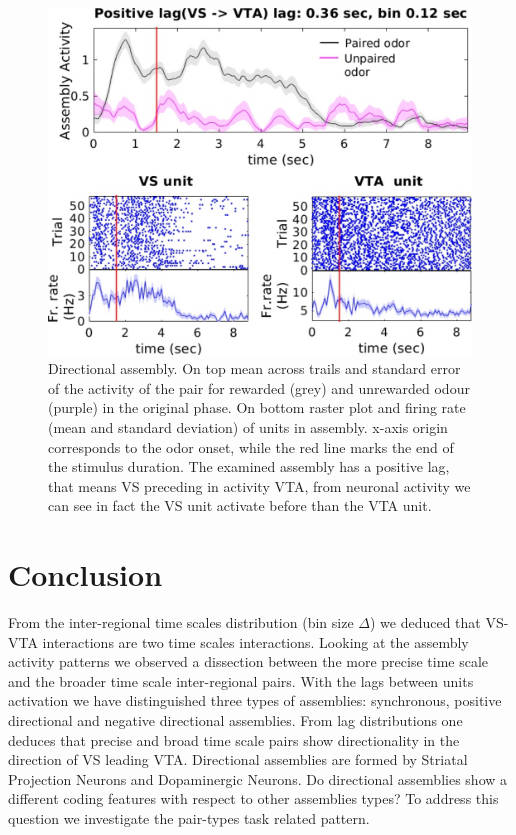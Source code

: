 \begin{figure}
    \centering
    \includegraphics[scale=0.6]{figures/DirectionalAsEx1.pdf}
    \caption{Directional assembly. On top mean across trails and standard error of the activity of the pair for rewarded (grey) and unrewarded odour (purple) in the original phase. On bottom raster plot and firing rate (mean and standard deviation) of units in assembly. x-axis origin corresponds to the odor onset, while the red line marks the end of the stimulus duration. The examined assembly has a positive lag, that means VS preceding in activity VTA, from neuronal activity we can see in fact the VS unit activate before than the VTA unit.}
    \label{fig:directional_assembly}
\end{figure}
\section{Conclusion}
From the inter-regional time scales distribution (bin size $\Delta$) we deduced that VS-VTA interactions are two time scales interactions. Looking at the assembly activity patterns we observed a dissection between the more precise time scale and the broader time scale inter-regional pairs. 
With the lags between units activation we have distinguished three types of assemblies: synchronous, positive directional and negative directional assemblies. From lag distributions one deduces that precise and broad time scale pairs show directionality in the direction of VS leading VTA.
Directional assemblies are formed by Striatal Projection Neurons and Dopaminergic Neurons.
Do directional assemblies show a different coding features with respect to other assemblies types?
To address this question we investigate the pair-types task related pattern.
  
